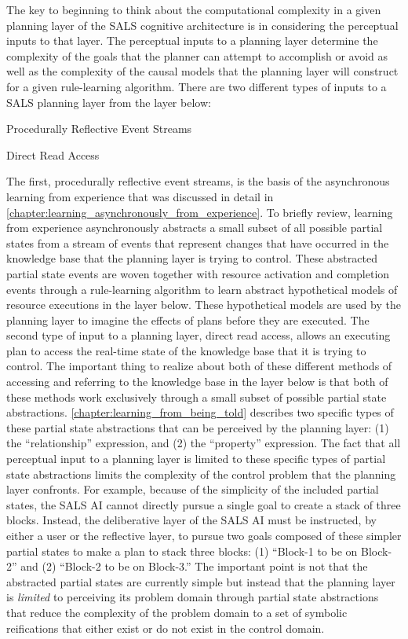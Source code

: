 The key to beginning to think about the computational complexity in a
given planning layer of the SALS cognitive architecture is in
considering the perceptual inputs to that layer.  The perceptual
inputs to a planning layer determine the complexity of the goals that
the planner can attempt to accomplish or avoid as well as the
complexity of the causal models that the planning layer will construct
for a given rule-learning algorithm.  There are two different types of
inputs to a SALS planning layer from the layer below:
\begin{packed_enumerate}
\item{Procedurally Reflective Event Streams}
\item{Direct Read Access}
\end{packed_enumerate}
The first, procedurally reflective event streams, is the basis of the
asynchronous learning from experience that was discussed in detail in
{\mbox{\autoref{chapter:learning_asynchronously_from_experience}}}.
To briefly review, learning from experience asynchronously abstracts a
small subset of all possible partial states from a stream of events
that represent changes that have occurred in the knowledge base that
the planning layer is trying to control.  These abstracted partial
state events are woven together with resource activation and
completion events through a rule-learning algorithm to learn abstract
hypothetical models of resource executions in the layer below.  These
hypothetical models are used by the planning layer to imagine the
effects of plans before they are executed.  The second type of input
to a planning layer, direct read access, allows an executing plan to
access the real-time state of the knowledge base that it is trying to
control.  The important thing to realize about both of these different
methods of accessing and referring to the knowledge base in the layer
below is that both of these methods work exclusively through a small
subset of possible partial state abstractions.
{\mbox{\autoref{chapter:learning_from_being_told}}}
describes two specific types of these partial state abstractions that
can be perceived by the planning layer: (1) the ``relationship''
expression, and (2) the ``property'' expression.  The fact that all
perceptual input to a planning layer is limited to these specific
types of partial state abstractions limits the complexity of the
control problem that the planning layer confronts.  For example,
because of the simplicity of the included partial states, the SALS AI
cannot directly pursue a single goal to create a stack of three
blocks.  Instead, the deliberative layer of the SALS AI must be
instructed, by either a user or the reflective layer, to pursue two
goals composed of these simpler partial states to make a plan to stack
three blocks: (1) ``Block-1 to be on Block-2'' and (2) ``Block-2 to be
on Block-3.''  The important point is not that the abstracted partial
states are currently simple but instead that the planning layer is
\emph{limited} to perceiving its problem domain through partial state
abstractions that reduce the complexity of the problem domain to a set
of symbolic reifications that either exist or do not exist in the
control domain.

